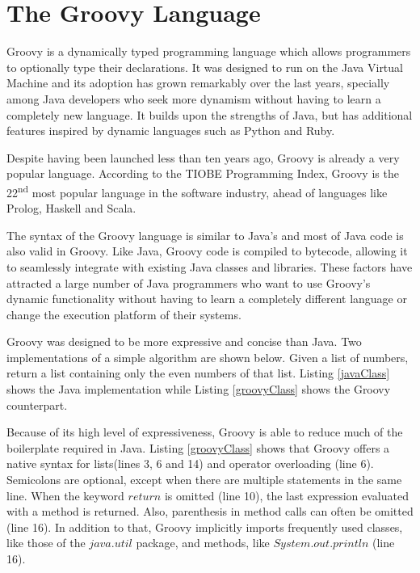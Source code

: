 \documentclass[preprint]{sigplanconf}
\begin{document}
%
%

\section{The Groovy Language\label{groovy}}
Groovy is a dynamically typed programming language which allows programmers to optionally type their declarations.
It was designed to run on the Java Virtual Machine and its adoption has grown remarkably over the last years, specially among Java developers who seek more dynamism without having to learn a completely new language.
It builds upon the strengths of Java, but has additional features inspired by dynamic languages such as Python and Ruby.

Despite having been launched less than ten years ago, Groovy is already a very popular language.
According to the TIOBE Programming Index, Groovy is the 22\textsuperscript{nd} most popular language in the software industry\cite{tiobe}, ahead of languages like Prolog, Haskell and Scala. 

The syntax of the Groovy language is similar to Java's and most of Java code is also valid in Groovy.
Like Java, Groovy code is compiled to bytecode, allowing it to seamlessly integrate with existing Java classes and libraries. 
These factors have attracted a large number of Java programmers who want to use Groovy's dynamic functionality without having to learn a completely different language or change the execution platform of their systems. 

Groovy was designed to be more expressive and concise than Java.
Two implementations of a simple algorithm are shown below.
Given a list of numbers, return a list containing only the even numbers of that list.
Listing \ref{javaClass} shows the Java implementation while Listing \ref{groovyClass} shows the Groovy counterpart. 

Because of its high level of expressiveness, Groovy is able to reduce much of the boilerplate required in Java.
Listing \ref{groovyClass} shows that Groovy offers a native syntax for lists(lines 3, 6 and 14) and operator overloading (line 6). 
Semicolons are optional, except when there are multiple statements in the same line. 
When the keyword $return$ is omitted (line 10), the last expression evaluated with a method is returned. 
Also, parenthesis in method calls can often be omitted (line 16).
In addition to that, Groovy implicitly imports frequently used classes, like those of the $java.util$ package, and methods, like $System.out.println$ (line 16).
\end{document}
